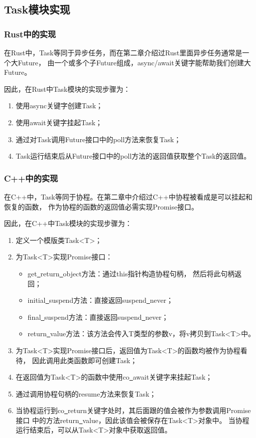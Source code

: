 \documentclass[supercite]{HustGraduPaper}
\theoremstyle{definition}
\begin{document}
\subsection{Task模块实现}

\subsubsection{Rust中的实现}

在Rust中，Task等同于异步任务，而在第二章介绍过Rust里面异步任务通常是一个大Future，
由一个或多个子Future组成，async/await关键字能帮助我们创建大Future。\par

因此，在Rust中Task模块的实现步骤为：

\begin{enumerate}
  \item 使用async关键字创建Task；
  \item 使用await关键字挂起Task；
  \item 通过对Task调用Future接口中的poll方法来恢复Task；
  \item Task运行结束后从Future接口中的poll方法的返回值获取整个Task的返回值。
\end{enumerate}

\subsubsection{C++中的实现}

在C++中，Task等同于协程。在第二章中介绍过C++中协程被看成是可以挂起和恢复的函数，
作为协程的函数的返回值必需实现Promise接口。\par

因此，在C++中Task模块的实现步骤为：

\begin{enumerate}
  \item 定义一个模版类Task<T>；
  \item 为Task<T>实现Promise接口：
    \begin{itemize}
      \item get\underline{~}return\underline{~}object方法：通过this指针构造协程句柄，
        然后将此句柄返回；
      \item initial\underline{~}suspend方法：直接返回suspend\underline{~}never；
      \item final\underline{~}suspend方法：直接返回suspend\underline{~}never；
      \item return\underline{~}value方法：该方法会传入T类型的参数v，将v拷贝到Task<T>中。
    \end{itemize}
  \item 为Task<T>实现Promise接口后，返回值为Task<T>的函数均被作为协程看待，
    因此调用此类函数即可创建Task；
  \item 在返回值为Task<T>的函数中使用co\underline{~}await关键字来挂起Task；
  \item 通过调用协程句柄的resume方法来恢复Task；
  \item 当协程运行到co\underline{~}return关键字处时，其后面跟的值会被作为参数调用Promise接口
    中的方法return\underline{~}value，因此该值会被保存在Task<T>对象中。
    当协程运行结束后，可以从Task<T>对象中获取返回值。
\end{enumerate}
\end{document}
